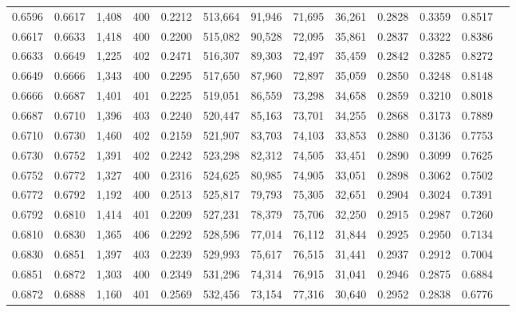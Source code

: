 \begin{tabular}{rrrrrrrrrrrrr}
0.6596 & 0.6617 & 1,408 & 400 &                                     0.2212 & 513,664 &  91,946 &  71,695 &  36,261 & 0.2828 & 0.3359 & 0.8517 \\
0.6617 & 0.6633 & 1,418 & 400 &                                     0.2200 & 515,082 &  90,528 &  72,095 &  35,861 & 0.2837 & 0.3322 & 0.8386 \\
0.6633 & 0.6649 & 1,225 & 402 &                                     0.2471 & 516,307 &  89,303 &  72,497 &  35,459 & 0.2842 & 0.3285 & 0.8272 \\
0.6649 & 0.6666 & 1,343 & 400 &                                     0.2295 & 517,650 &  87,960 &  72,897 &  35,059 & 0.2850 & 0.3248 & 0.8148 \\
0.6666 & 0.6687 & 1,401 & 401 &                                     0.2225 & 519,051 &  86,559 &  73,298 &  34,658 & 0.2859 & 0.3210 & 0.8018 \\
0.6687 & 0.6710 & 1,396 & 403 &                                     0.2240 & 520,447 &  85,163 &  73,701 &  34,255 & 0.2868 & 0.3173 & 0.7889 \\
0.6710 & 0.6730 & 1,460 & 402 &                                     0.2159 & 521,907 &  83,703 &  74,103 &  33,853 & 0.2880 & 0.3136 & 0.7753 \\
0.6730 & 0.6752 & 1,391 & 402 &                                     0.2242 & 523,298 &  82,312 &  74,505 &  33,451 & 0.2890 & 0.3099 & 0.7625 \\
0.6752 & 0.6772 & 1,327 & 400 &                                     0.2316 & 524,625 &  80,985 &  74,905 &  33,051 & 0.2898 & 0.3062 & 0.7502 \\
0.6772 & 0.6792 & 1,192 & 400 &                                     0.2513 & 525,817 &  79,793 &  75,305 &  32,651 & 0.2904 & 0.3024 & 0.7391 \\
0.6792 & 0.6810 & 1,414 & 401 &                                     0.2209 & 527,231 &  78,379 &  75,706 &  32,250 & 0.2915 & 0.2987 & 0.7260 \\
0.6810 & 0.6830 & 1,365 & 406 &                                     0.2292 & 528,596 &  77,014 &  76,112 &  31,844 & 0.2925 & 0.2950 & 0.7134 \\
0.6830 & 0.6851 & 1,397 & 403 &                                     0.2239 & 529,993 &  75,617 &  76,515 &  31,441 & 0.2937 & 0.2912 & 0.7004 \\
0.6851 & 0.6872 & 1,303 & 400 &                                     0.2349 & 531,296 &  74,314 &  76,915 &  31,041 & 0.2946 & 0.2875 & 0.6884 \\
0.6872 & 0.6888 & 1,160 & 401 &                                     0.2569 & 532,456 &  73,154 &  77,316 &  30,640 & 0.2952 & 0.2838 & 0.6776 \\

\end{tabular}

